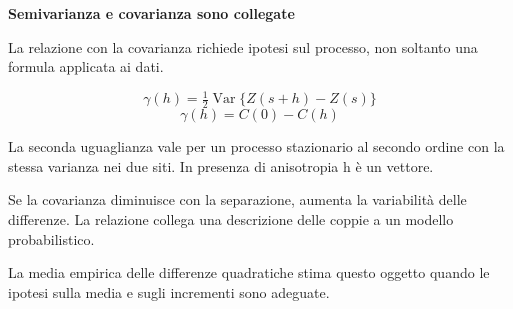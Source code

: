 \documentclass[12pt,aspectratio=1610]{beamer}
\newcommand{\PBody}[1]{\par{\fontsize{11.3}{14.8}\selectfont #1\par}}
\newcommand{\PSmall}[1]{\par{\fontsize{9.8}{13.1}\selectfont #1\par}}
\newcommand{\PInfo}[1]{%
\begin{tcolorbox}[enhanced,arc=1.6mm,boxrule=.55pt,colback=GeoTint,
 colframe=Rule!80!Classical,left=2.3mm,right=2.3mm,top=2mm,bottom=2mm,
 before skip=1mm,after skip=1mm]
\PSmall{#1}\end{tcolorbox}}
\begin{document}
\begin{frame}[plain]\hypertarget{slide75}{}
\begin{lrbox}{\TitleBox}
\begin{minipage}[t]{17.7cm}\raggedright\color{Ink}\fontsize{11.3}{14.8}\selectfont
\color{Navy}\bfseries\fontsize{20.6}{24.5}\selectfont Semivarianza e covarianza sono collegate
\end{minipage}\end{lrbox}

\begin{lrbox}{\RecallBox}
\begin{minipage}[t]{14.3cm}\raggedright\color{Ink}\fontsize{11.3}{14.8}\selectfont
\fontsize{10.3}{13.8}\selectfont La relazione con la covarianza richiede ipotesi sul processo, non soltanto una formula applicata ai dati.
\end{minipage}\end{lrbox}

\begin{lrbox}{\PilotLeftBox}
\begin{minipage}[t]{10.05cm}\raggedright\color{Ink}\fontsize{11.3}{14.8}\selectfont
\[\gamma(h)=\tfrac12\operatorname{Var}\{Z(s+h)-Z(s)\}\]
\[\gamma(h)=C(0)-C(h)\]
\PInfo{La seconda uguaglianza vale per un processo stazionario al secondo ordine con la stessa varianza nei due siti. In presenza di anisotropia h è un vettore.}

\end{minipage}\end{lrbox}

\begin{lrbox}{\PilotRightBox}
\begin{minipage}[t]{7.55cm}\raggedright\color{Ink}\fontsize{11.3}{14.8}\selectfont
\PBody{Se la covarianza diminuisce con la separazione, aumenta la variabilità delle differenze. La relazione collega una descrizione delle coppie a un modello probabilistico.}
\vspace{2.5mm}
\PBody{La media empirica delle differenze quadratiche stima questo oggetto quando le ipotesi sulla media e sugli incrementi sono adeguate.}
\vspace{2.5mm}

\end{minipage}\end{lrbox}


\end{frame}
\end{document}
